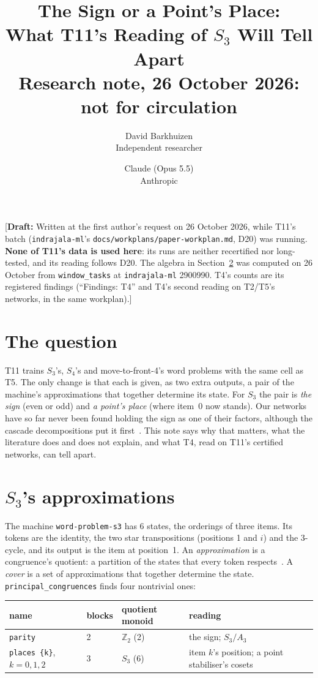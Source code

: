 \documentclass[11pt]{article}
\title{The Sign or a Point's Place:\\What T11's Reading of $S_3$ Will Tell Apart\\[0.5em]
\large Research note, 26 October 2026: not for circulation}
\author{
  David Barkhuizen\\
  Independent researcher
  \and
  Claude (Opus 5.5)\\
  Anthropic
}
\date{}
\newcommand{\draftnote}[1]{\textcolor{red!70!black}{[\textbf{Draft:} #1]}}
\begin{document}
\maketitle

\draftnote{Written at the first author's request on 26 October 2026, while T11's batch
(\texttt{indrajala-ml}'s \texttt{docs/\allowbreak workplans/\allowbreak paper-workplan.md}, D20) was
running. \textbf{None of T11's data is used here}: its runs are neither recertified nor long-tested,
and its reading follows D20. The algebra in Section~\ref{sec:algebra} was computed on 26 October from
\texttt{window\_tasks} at \texttt{indrajala-ml} 2900990. T4's counts are its registered findings
(``Findings: T4'' and T4's second reading on T2/T5's networks, in the same workplan).}

\section{The question}

T11 trains $S_3$'s, $S_4$'s and move-to-front-4's word problems with the same cell as T5. The only
change is that each is given, as two extra outputs, a pair of the machine's approximations that
together determine its state. For $S_3$ the pair is \emph{the sign} (even or odd) and \emph{a point's
place} (where item~0 now stands). Our networks have so far never been found holding the sign as one
of their factors, although the cascade decompositions put it first~\citep{krohn-rhodes-1965-algebraic-theory-machines}.
This note says why that matters, what the literature does and does not explain, and what T4, read
on T11's certified networks, can tell apart.

\section{\texorpdfstring{$S_3$}{S3}'s approximations}\label{sec:algebra}

The machine \texttt{word-problem-s3} has 6 states, the orderings of three items. Its tokens are the
identity, the two star transpositions (positions 1 and $i$) and the 3-cycle, and its output is the
item at position~1. An \emph{approximation} is a congruence's quotient: a partition of the states
that every token respects~\citep{egri-nagy-2024-covering-lemma-transformation-semigroups}. A
\emph{cover} is a set of approximations that together determine the state.
\texttt{principal\_congruences} finds four nontrivial ones:

\begin{center}
\begin{tabular}{@{}llll@{}}
\toprule
name & blocks & quotient monoid & reading \\
\midrule
\texttt{parity} & 2 & $\mathbb{Z}_2$ (2) & the sign; $S_3 / A_3$ \\
\texttt{places \{k\}}, $k = 0, 1, 2$ & 3 & $S_3$ (6) & item $k$'s position; a point stabiliser's cosets \\
\bottomrule
\end{tabular}
\end{center}
\end{document}
